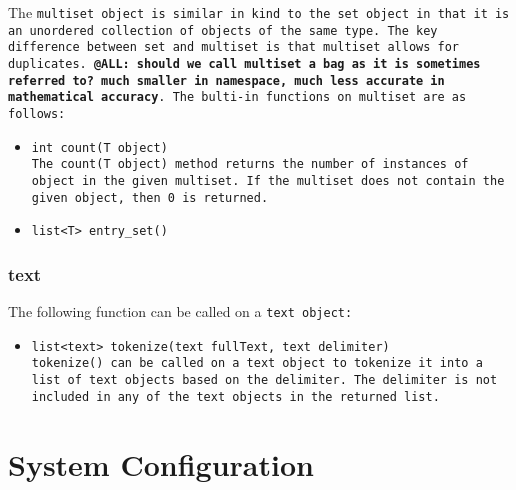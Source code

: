 \documentclass{book}
\begin{document}
The \tt multiset \rm object is similar in kind to the \tt set \rm object in that
it is an unordered collection of objects of the same type. The key difference
between \tt set \rm and \tt multiset \rm is that \tt multiset \rm allows for
duplicates. \textbf{@ALL: should we call multiset a \tt bag \rm as it is sometimes
referred to? much smaller in namespace, much less accurate in mathematical accuracy}.
The bulti-in functions on \tt multiset \rm are as follows:

\begin{itemize}

\item[] \tt int count(T object) \rm \\

The \tt count(T object) \rm method returns the number of instances of \tt object \rm
in the given \tt multiset\rm. If the \tt multiset \rm does not contain the given
object, then \tt 0 \rm is returned. 

\item[] \tt list<T> entry\_set() \rm \\

\end{itemize}


\subsection{text} %
\label{sub:text}

The following function can be called on a \tt text \rm object:

\begin{itemize}

\item[] \tt list<text> tokenize(text fullText, text delimiter) \rm \\

\tt tokenize() \rm can be called on a \tt text \rm object to tokenize it into a
list of \tt text \rm objects based on the delimiter. The delimiter is not included
in any of the \tt text \rm objects in the returned list.

\end{itemize}




\chapter{System Configuration} %
\label{cha:system_configuration}
\end{document}
